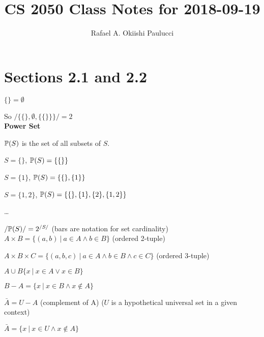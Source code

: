 \documentclass{exam}
\title{CS 2050 Class Notes for 2018-09-19}
\author{Rafael A. Okiishi Paulucci}
\date{}
\begin{document}
	\maketitle
	\section{Sections 2.1 and 2.2}
	
	$\{\} = \emptyset$
	
	So $/\{ \{\}, \emptyset, \{\{\}\} \}/ = 2$\\
	
	\textbf{Power Set}
	
	$\Bbb P (S)$ is the set of all subsets of $S$.
	
	$S = \{\}$, $\Bbb P (S) = \{ \{ \} \}$
	
	$S = \{1\}$, $\Bbb P (S) = \{  \{\}, \{1\}  \}$
	
	$S = \{1, 2\}$, $\Bbb P (S) = \{  \{\},  \{ 1 \}, \{ 2 \},  \{1, 2\}  \}$ 
	
	\dots
	
	$/ \Bbb P(S)/ = 2^{ /S/ }$ (bars are notation for set cardinality)\\ 
	
	$A \times B = \{ (a,b)\ |\ a \in A \wedge b \in B \}$ (ordered 2-tuple)
	
	$A \times B \times C = \{ (a,b,c)\ |\ a \in A \wedge b \in B \wedge c \in C \}$ (ordered 3-tuple)
	
	$A \cup B \{ x \ | \ x \in A \lor x \in B\}$
	
	$B - A = \{ x \ |\ x \in B \wedge x \notin A \}$
	
	$\bar{A} = U - A$ (complement of A) ($U$ is a hypothetical universal set in a given context)
	
	$\bar{A} = \{ x \ |\ x \in U \wedge x \notin A \}$
	
	
	
	

	
\end{document}
